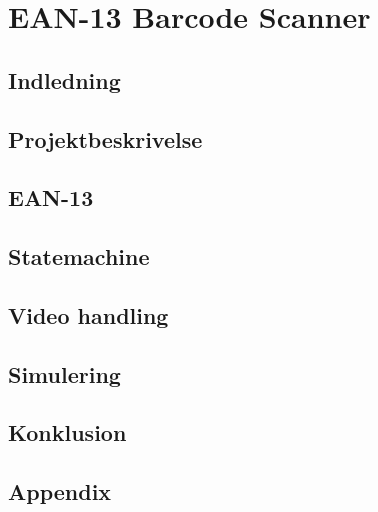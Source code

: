 \chapter*{EAN-13 Barcode Scanner}

\section*{Indledning}

\section*{Projektbeskrivelse}

\section*{EAN-13}

\section*{Statemachine}

\section*{Video handling}

\section*{Simulering}

\section*{Konklusion}

\section*{Appendix}
